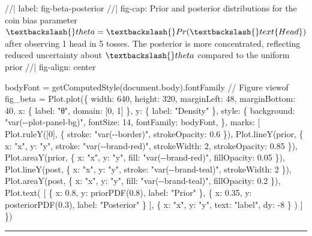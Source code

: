\documentclass[
  letterpaper,
  DIV=11,
  numbers=noendperiod]{scrreprt}
\newenvironment{Shaded}{\begin{snugshade}}{\end{snugshade}}
\newcommand{\NormalTok}[1]{\textcolor[rgb]{0.00,0.23,0.31}{#1}}
\theoremstyle{definition}
\theoremstyle{plain}
\theoremstyle{definition}
\theoremstyle{remark}
\begin{document}
\begin{Shaded}
\begin{Highlighting}[]
\NormalTok{//| label: fig{-}beta{-}posterior}
\NormalTok{//| fig{-}cap: Prior and posterior distributions for the coin bias parameter $\textbackslash{}theta=\textbackslash{}Pr(\textbackslash{}text\{Head\})$ after observing 1 head in 5 tosses. The posterior is more concentrated, reflecting reduced uncertainty about $\textbackslash{}theta$ compared to the uniform prior}
\NormalTok{//| fig{-}align: center}

\NormalTok{bodyFont = getComputedStyle(document.body).fontFamily}
\NormalTok{// Figure}
\NormalTok{viewof fig\_beta = Plot.plot(\{}
\NormalTok{  width: 640,}
\NormalTok{  height: 320,}
\NormalTok{  marginLeft: 48,}
\NormalTok{  marginBottom: 40,}
\NormalTok{  x: \{ label: "θ", domain: [0, 1] \},}
\NormalTok{  y: \{ label: "Density" \},}
\NormalTok{  style: \{ background: "var({-}{-}plot{-}panel{-}bg)", }
\NormalTok{           fontSize: 14,}
\NormalTok{           fontFamily: bodyFont,  \},}
\NormalTok{  marks: [}
\NormalTok{    Plot.ruleY([0], \{ stroke: "var({-}{-}border)", strokeOpacity: 0.6 \}),}
\NormalTok{    Plot.lineY(prior, \{ x: "x", y: "y", stroke: "var({-}{-}brand{-}red)",  strokeWidth: 2, strokeOpacity: 0.85 \}),}
\NormalTok{    Plot.areaY(prior, \{ x: "x", y: "y", fill: "var({-}{-}brand{-}red)", fillOpacity: 0.05 \}),}
\NormalTok{    Plot.lineY(post,  \{ x: "x", y: "y", stroke: "var({-}{-}brand{-}teal)", strokeWidth: 2 \}),}
\NormalTok{    Plot.areaY(post,  \{ x: "x", y: "y", fill: "var({-}{-}brand{-}teal)", fillOpacity: 0.2 \}),}
\NormalTok{    Plot.text(}
\NormalTok{      [}
\NormalTok{        \{ x: 0.8, y: priorPDF(0.8),     label: "Prior" \},}
\NormalTok{        \{ x: 0.35, y: posteriorPDF(0.3), label: "Posterior" \}}
\NormalTok{      ],}
\NormalTok{      \{ x: "x", y: "y", text: "label", dy: {-}8 \}}
\NormalTok{    )}
\NormalTok{  ]}
\NormalTok{\})}
\end{Highlighting}
\end{Shaded}

\begin{center}\rule{0.5\linewidth}{0.5pt}\end{center}
\end{document}
